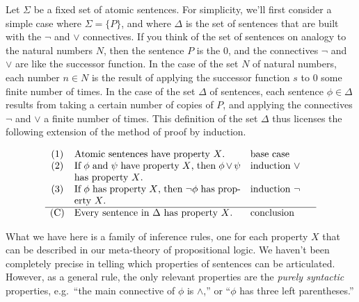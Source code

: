 

Let $\Sigma$ be a fixed set of atomic sentences.  For simplicity,
we'll first consider a simple case where $\Sigma = \{ P \}$, and where
$\Delta$ is the set of sentences that are built with the $\neg$ and $\vee$
connectives.  If you think of the set of sentences on analogy to the
natural numbers $N$, then the sentence $P$ is the $0$, and the
connectives $\neg$ and $\vee$ are like the successor function.  In the
case of the set $N$ of natural numbers, each number $n\in N$ is the
result of applying the successor function $s$ to $0$ some finite
number of times.  In the case of the set $\Delta$ of sentences, each
sentence $\phi\in \Delta$ results from taking a certain number of copies of
$P$, and applying the connectives $\neg$ and $\vee$ a finite number of
times.  This definition of the set $\Delta$ thus licenses the following
extension of the method of proof by induction.

\bigskip \begin{tcolorbox}[enhanced,width=11cm,title=Induction on the
  construction of sentences,attach boxed title to top
  left={yshift=-2mm,xshift=4mm},boxed title style={sharp corners}]
  \[ \begin{array}{c p{6cm} p{2.2cm}}
       (1) & Atomic sentences have property $X$. & base case \\
       (2) & If $\phi$ and $\psi$ have property
             $X$, then $\phi\vee\psi$ has
             property $X$. & induction $\vee$ \\
       (3) & If $\phi$ has property $X$, then
             $\neg\phi$ has property $X$. & induction
                                            $\neg$ \\ \hline
       (\text{C}) & Every sentence in $\Delta$ has property
                    $X$. & conclusion \end{array} \] \end{tcolorbox}
 \bigskip What we have here is a family of inference rules, one for
 each property $X$ that can be described in our meta-theory of
 propositional logic.  We haven't been completely precise in telling
 which properties of sentences can be articulated.  However, as a
 general rule, the only relevant properties are the {\it purely
   syntactic} properties, e.g.\ ``the main connective of $\phi$ is $\wedge$,'' or ``$\phi$ has three left parentheses.''

